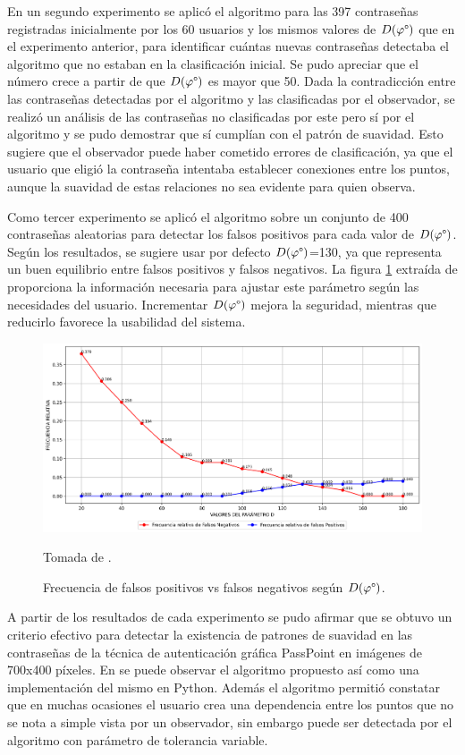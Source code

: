 \documentclass[12pt]{report}
\begin{document}
En un segundo experimento se aplicó el algoritmo para las 397 contraseñas registradas inicialmente por los 60 usuarios y los mismos valores de $D(\varphi\degree)$ que en el experimento anterior, para identificar cuántas nuevas contraseñas detectaba el algoritmo que no estaban en la clasificación inicial. Se pudo apreciar que el número crece a partir de que $D(\varphi\degree)$ es mayor que 50\degree. Dada la contradicción entre las contraseñas detectadas por el algoritmo y las clasificadas por el observador, se realizó un análisis de las contraseñas no clasificadas por este pero sí por el algoritmo y se pudo demostrar que sí cumplían con el patrón de suavidad. Esto sugiere que el observador puede haber cometido errores de clasificación, ya que el usuario que eligió la contraseña intentaba establecer conexiones entre los puntos, aunque la suavidad de estas relaciones no sea evidente para quien observa.
 

Como tercer experimento se aplicó el algoritmo sobre un conjunto de 400 contraseñas aleatorias para detectar los falsos positivos para cada valor de $D(\varphi\degree)$. Según los resultados, se sugiere usar por defecto $D(\varphi\degree)$=130\degree, ya que representa un buen equilibrio entre falsos positivos y falsos negativos. La figura \ref{frecuencia}  extraída de \cite{3} proporciona la información necesaria para ajustar este parámetro según las necesidades del usuario. Incrementar $D(\varphi\degree)$ mejora la seguridad, mientras que reducirlo favorece la usabilidad del sistema.

\begin{figure}[ht]
	\centering
	\includegraphics[width=1\textwidth]{grafosviel.png}
	\caption{Frecuencia de falsos positivos vs falsos negativos según ${D(\varphi\degree)}$.} Tomada de \cite{3}.
	\label{frecuencia}
\end{figure}

A partir de los resultados de cada experimento se pudo afirmar que se obtuvo  un criterio efectivo para detectar la existencia de patrones de suavidad en las contraseñas de la técnica de autenticación gráfica PassPoint en imágenes de 700x400 píxeles. En \cite{3} se puede observar el algoritmo propuesto así como una implementación del mismo en Python. Además el algoritmo permitió constatar que en muchas ocasiones el usuario crea una dependencia entre los puntos que no se nota a simple vista por un observador, sin embargo puede ser detectada por el algoritmo con parámetro de tolerancia variable.
\end{document}
